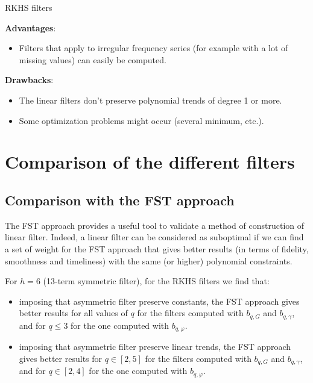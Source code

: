 \documentclass[
  12pt,
  ,
  a4paper]{article}
\providecommand{\tightlist}{%
  \setlength{\itemsep}{0pt}\setlength{\parskip}{0pt}}
\newcommand\1{\mathds{1}}
\begin{document}
\begin{summary}{RKHS filters}

\textbf{Advantages}:

\begin{itemize}
\tightlist
\item
  Filters that apply to irregular frequency series (for example with a lot of missing values) can easily be computed.
\end{itemize}

\textbf{Drawbacks}:

\begin{itemize}
\item
  The linear filters don't preserve polynomial trends of degree 1 or more.
\item
  Some optimization problems might occur (several minimum, etc.).
\end{itemize}

\end{summary}

\hypertarget{comparison-of-the-different-filters}{%
\section{Comparison of the different filters}\label{comparison-of-the-different-filters}}

\hypertarget{comparison-with-the-fst-approach}{%
\subsection{Comparison with the FST approach}\label{comparison-with-the-fst-approach}}

The FST approach provides a useful tool to validate a method of construction of linear filter.
Indeed, a linear filter can be considered as suboptimal if we can find a set of weight for the FST approach that gives better results (in terms of fidelity, smoothness and timeliness) with the same (or higher) polynomial constraints.

For \(h=6\) (13-term symmetric filter), for the RKHS filters we find that:

\begin{itemize}
\item
  imposing that asymmetric filter preserve constants, the FST approach gives better results for all values of \(q\) for the filters computed with \(b_{q,G}\) and \(b_{q,\gamma}\), and for \(q\leq 3\) for the one computed with \(b_{q,\varphi}\).
\item
  imposing that asymmetric filter preserve linear trends, the FST approach gives better results for \(q\in[2,5]\) for the filters computed with \(b_{q,G}\) and \(b_{q,\gamma}\), and for \(q\in[2,4]\) for the one computed with \(b_{q,\varphi}\).
\end{itemize}
\end{document}
